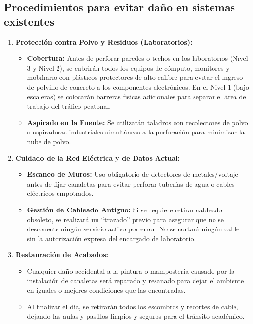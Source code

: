 \subsection*{Procedimientos para evitar daño en sistemas existentes}

\begin{enumerate}
    \item \textbf{Protección contra Polvo y Residuos (Laboratorios):}
    \begin{itemize}
        \item \textbf{Cobertura:} Antes de perforar paredes o techos en los laboratorios (Nivel 3 y Nivel 2), se cubrirán todos los equipos de cómputo, monitores y mobiliario con plásticos protectores de alto calibre para evitar el ingreso de polvillo de concreto a los componentes electrónicos. En el Nivel 1 (bajo escaleras) se colocarán barreras físicas adicionales para separar el área de trabajo del tráfico peatonal.
        \item \textbf{Aspirado en la Fuente:} Se utilizarán taladros con recolectores de polvo o aspiradoras industriales simultáneas a la perforación para minimizar la nube de polvo.
    \end{itemize}
    \item \textbf{Cuidado de la Red Eléctrica y de Datos Actual:}
    \begin{itemize}
        \item \textbf{Escaneo de Muros:} Uso obligatorio de detectores de metales/voltaje antes de fijar canaletas para evitar perforar tuberías de agua o cables eléctricos empotrados.
        \item \textbf{Gestión de Cableado Antiguo:} Si se requiere retirar cableado obsoleto, se realizará un ``trazado'' previo para asegurar que no se desconecte ningún servicio activo por error. No se cortará ningún cable sin la autorización expresa del encargado de laboratorio.
    \end{itemize}
    \item \textbf{Restauración de Acabados:}
    \begin{itemize}
        \item Cualquier daño accidental a la pintura o mampostería causado por la instalación de canaletas será reparado y resanado para dejar el ambiente en iguales o mejores condiciones que las encontradas.
        \item Al finalizar el día, se retirarán todos los escombros y recortes de cable, dejando las aulas y pasillos limpios y seguros para el tránsito académico.
    \end{itemize}
\end{enumerate}
